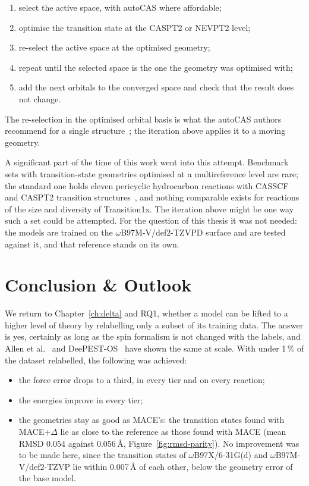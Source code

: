 \begin{enumerate}
  \item select the active space, with autoCAS where affordable;
  \item optimise the transition state at the CASPT2 or NEVPT2 level;
  \item re-select the active space at the optimised geometry;
  \item repeat until the selected space is the one the geometry was
    optimised with;
  \item add the next orbitals to the converged space and check that the
    result does not change.
\end{enumerate}

The re-selection in the optimised orbital basis is what the autoCAS
authors recommend for a single structure~\cite{stein2019autocas}; the
iteration above applies it to a moving geometry.

A significant part of the time of this work went into this attempt.
Benchmark sets with transition-state geometries optimised at a
multireference level are rare; the standard one holds eleven
pericyclic hydrocarbon reactions with CASSCF and CASPT2 transition
structures~\cite{guner2003}, and nothing comparable exists for
reactions of the size and diversity of Transition1x. The iteration
above might be one way such a set could be attempted. For the question
of this thesis it was not needed: the models are trained on the \mbox{$\omega$B97M-V/def2-TZVPD}
surface and are tested against it, and that reference stands on its
own.

\chapter{Conclusion \& Outlook}
\label{ch:conclusion}

We return to Chapter~\ref{ch:delta} and RQ1, whether a model can be
lifted to a higher level of theory by relabelling only a subset of its
training data. The answer is yes, certainly as long as the spin
formalism is not changed with the labels, and Allen et
al.~\cite{allen2026} and DeePEST-OS~\cite{ren2026} have shown the same
at scale. With under 1\,\% of the dataset relabelled, the following
was achieved:

\begin{itemize}
  \item the force error drops to a third, in every tier and on every
    reaction;
  \item the energies improve in every tier;
  \item the geometries stay as good as MACE's: the transition states
    found with MACE+$\Delta$ lie as close to the reference as those
    found with MACE (mean RMSD 0.054 against 0.056\,\AA,
    Figure~\ref{fig:rmsd-parity}). No improvement was to be made
    here, since the transition states of
    \mbox{$\omega$B97X/6-31G(d)} and \mbox{$\omega$B97M-V/def2-TZVP}
    lie within 0.007\,\AA{} of each other, below the geometry error
    of the base model.
\end{itemize}

